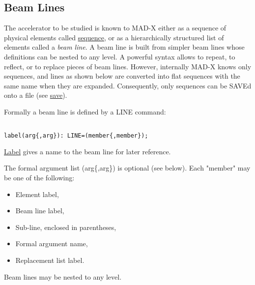 




\subsection{Beam Lines}
 The accelerator to be studied is known to MAD-X either as a sequence of physical elements called \href{sequence.html}{sequence}, or as a hierarchically structured list of elements called a \emph{beam line}. A beam line is built from simpler beam lines whose definitions can be nested to any level. A powerful syntax allows to repeat, to reflect, or to replace pieces of beam lines. However, internally MAD-X knows only sequences, and lines as shown below are converted into flat sequences with the same name when they are expanded. Consequently, only sequences can be SAVEd onto a file (see \href{../control/general.html#save}{save}). 

 Formally a beam line is defined by a LINE command: 
\begin{verbatim}

label(arg{,arg}): LINE=(member{,member});
\end{verbatim}\href{label.html}{Label} gives a name to the beam line for later reference. 

 The formal argument list (arg\{,arg\}) is optional (see below). Each "member" may be one of the following: 
\begin{itemize}
	\item  Element label, 
	\item  Beam line label, 
	\item  Sub-line, enclosed in parentheses, 
	\item  Formal argument name, 
	\item  Replacement list label. 
\end{itemize} Beam lines may be nested to any level.  

